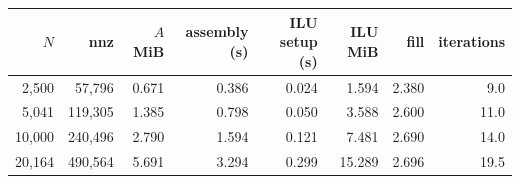 \begin{tabular}{rrrrrrrr}
\toprule
$N$ & nnz & $A$ MiB & assembly (s) & ILU setup (s) & ILU MiB & fill & iterations \\
\midrule
2,500  & 57,796  & 0.671 & 0.386 & 0.024 & 1.594 & 2.380 & 9.0 \\
5,041  & 119,305 & 1.385 & 0.798 & 0.050 & 3.588 & 2.600 & 11.0 \\
10,000 & 240,496 & 2.790 & 1.594 & 0.121 & 7.481 & 2.690 & 14.0 \\
20,164 & 490,564 & 5.691 & 3.294 & 0.299 & 15.289 & 2.696 & 19.5 \\
\bottomrule
\end{tabular}
